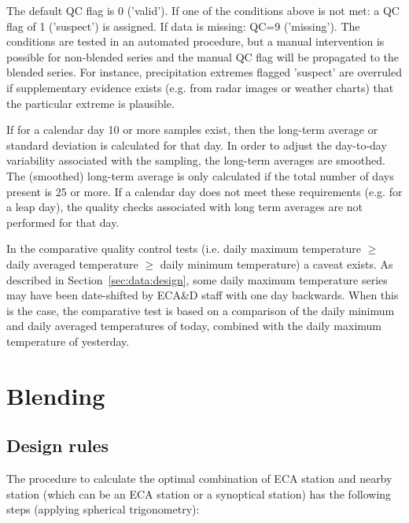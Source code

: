 \documentclass[a4paper,11pt]{article}
\begin{document}
The default QC flag is 0 ('valid'). If one of the conditions above is
not met: a QC flag of 1 ('suspect') is assigned. If data is missing:
QC=9 ('missing'). The conditions are tested in an automated procedure,
but a manual intervention is possible for non-blended series and the
manual QC flag will be propagated to the blended series. For instance,
precipitation extremes flagged 'suspect' are overruled if
supplementary evidence exists (e.g. from radar images or weather
charts) that the particular extreme is plausible.

If for a calendar day 10 or more samples exist, then the long-term
average or standard deviation is calculated for that day. In order to
adjust the day-to-day variability associated with the sampling, the
long-term averages are smoothed. The (smoothed) long-term average is
only calculated if the total number of days present is 25 or more. If
a calendar day does not meet these requirements (e.g. for a leap day),
the quality checks associated with long term averages are not
performed for that day.

In the comparative quality control tests (i.e. daily maximum temperature $\ge$
daily averaged temperature $\ge$ daily minimum temperature) a caveat exists.
As described in Section~\ref{sec:data:design}, some daily maximum temperature
series may have been date-shifted by ECA\&D staff with one day backwards.
When this is the case, the comparative test is based on a comparison of the 
daily minimum and daily averaged temperatures of today, combined with the
daily maximum temperature of yesterday.


\section{Blending}
\label{sec:blending}

\subsection{Design rules}
\label{sec:blendrules}

The procedure to calculate the optimal combination of ECA station and
nearby station (which can be an ECA station or a synoptical station)
has the following steps (applying spherical trigonometry):
\end{document}
